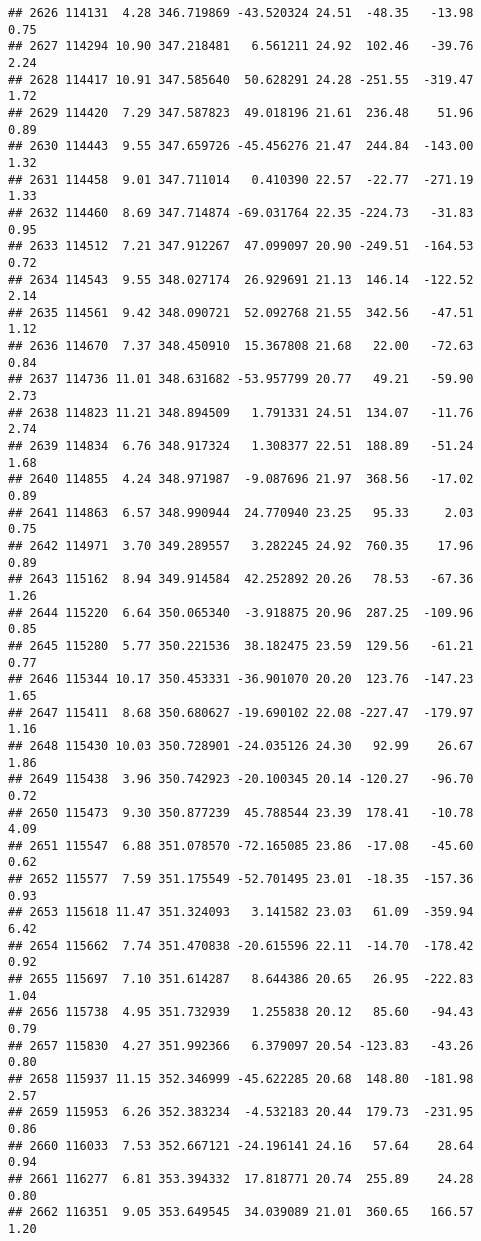 \documentclass[]{article}
\begin{document}
\begin{verbatim}
## 2626 114131  4.28 346.719869 -43.520324 24.51  -48.35   -13.98  0.75
## 2627 114294 10.90 347.218481   6.561211 24.92  102.46   -39.76  2.24
## 2628 114417 10.91 347.585640  50.628291 24.28 -251.55  -319.47  1.72
## 2629 114420  7.29 347.587823  49.018196 21.61  236.48    51.96  0.89
## 2630 114443  9.55 347.659726 -45.456276 21.47  244.84  -143.00  1.32
## 2631 114458  9.01 347.711014   0.410390 22.57  -22.77  -271.19  1.33
## 2632 114460  8.69 347.714874 -69.031764 22.35 -224.73   -31.83  0.95
## 2633 114512  7.21 347.912267  47.099097 20.90 -249.51  -164.53  0.72
## 2634 114543  9.55 348.027174  26.929691 21.13  146.14  -122.52  2.14
## 2635 114561  9.42 348.090721  52.092768 21.55  342.56   -47.51  1.12
## 2636 114670  7.37 348.450910  15.367808 21.68   22.00   -72.63  0.84
## 2637 114736 11.01 348.631682 -53.957799 20.77   49.21   -59.90  2.73
## 2638 114823 11.21 348.894509   1.791331 24.51  134.07   -11.76  2.74
## 2639 114834  6.76 348.917324   1.308377 22.51  188.89   -51.24  1.68
## 2640 114855  4.24 348.971987  -9.087696 21.97  368.56   -17.02  0.89
## 2641 114863  6.57 348.990944  24.770940 23.25   95.33     2.03  0.75
## 2642 114971  3.70 349.289557   3.282245 24.92  760.35    17.96  0.89
## 2643 115162  8.94 349.914584  42.252892 20.26   78.53   -67.36  1.26
## 2644 115220  6.64 350.065340  -3.918875 20.96  287.25  -109.96  0.85
## 2645 115280  5.77 350.221536  38.182475 23.59  129.56   -61.21  0.77
## 2646 115344 10.17 350.453331 -36.901070 20.20  123.76  -147.23  1.65
## 2647 115411  8.68 350.680627 -19.690102 22.08 -227.47  -179.97  1.16
## 2648 115430 10.03 350.728901 -24.035126 24.30   92.99    26.67  1.86
## 2649 115438  3.96 350.742923 -20.100345 20.14 -120.27   -96.70  0.72
## 2650 115473  9.30 350.877239  45.788544 23.39  178.41   -10.78  4.09
## 2651 115547  6.88 351.078570 -72.165085 23.86  -17.08   -45.60  0.62
## 2652 115577  7.59 351.175549 -52.701495 23.01  -18.35  -157.36  0.93
## 2653 115618 11.47 351.324093   3.141582 23.03   61.09  -359.94  6.42
## 2654 115662  7.74 351.470838 -20.615596 22.11  -14.70  -178.42  0.92
## 2655 115697  7.10 351.614287   8.644386 20.65   26.95  -222.83  1.04
## 2656 115738  4.95 351.732939   1.255838 20.12   85.60   -94.43  0.79
## 2657 115830  4.27 351.992366   6.379097 20.54 -123.83   -43.26  0.80
## 2658 115937 11.15 352.346999 -45.622285 20.68  148.80  -181.98  2.57
## 2659 115953  6.26 352.383234  -4.532183 20.44  179.73  -231.95  0.86
## 2660 116033  7.53 352.667121 -24.196141 24.16   57.64    28.64  0.94
## 2661 116277  6.81 353.394332  17.818771 20.74  255.89    24.28  0.80
## 2662 116351  9.05 353.649545  34.039089 21.01  360.65   166.57  1.20

\end{verbatim}
\end{document}
